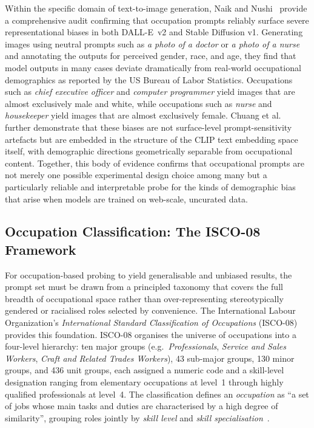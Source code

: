 Within the specific domain of text-to-image generation, Naik and Nushi\
\cite{Naik_2023_SocialBiasesThroughTheTextToImageGenerationLens} provide a comprehensive audit confirming that
occupation prompts reliably surface severe representational biases in both DALL-E~v2 and
Stable Diffusion v1.  Generating images using neutral prompts such as \emph{a photo of a
	doctor} or \emph{a photo of a nurse} and annotating the outputs for perceived gender, race, and age, they find that model
outputs in many cases deviate dramatically from real-world occupational demographics as
reported by the US Bureau of Labor Statistics.  Occupations such as \emph{chief executive
	officer} and \emph{computer programmer} yield images that are almost exclusively male and
white, while occupations such as \emph{nurse} and \emph{housekeeper} yield images that are
almost exclusively female.  Chuang et al.~\cite{Chuang_2023_DebiasingVisionLanguageModelsViaBiasedPrompts} further
demonstrate that these biases are not surface-level prompt-sensitivity artefacts but are
embedded in the structure of the CLIP text embedding space itself, with demographic
directions geometrically separable from occupational content.  Together, this body of
evidence confirms that occupational prompts are not merely one possible experimental design
choice among many but a particularly reliable and interpretable probe for the kinds of
demographic bias that arise when models are trained on web-scale, uncurated data.

\subsection{Occupation Classification: The ISCO-08 Framework}
\label{subsubsec:isco}

For occupation-based probing to yield generalisable and unbiased results, the prompt set must
be drawn from a principled taxonomy that covers the full breadth of occupational space rather
than over-representing stereotypically gendered or racialised roles selected by convenience.
The International Labour Organization's \emph{International Standard Classification of
	Occupations} (ISCO-08)~\cite{ILO_ISCO08} provides this foundation.  ISCO-08 organises the
universe of occupations into a four-level hierarchy: ten major groups (e.g.\
\emph{Professionals}, \emph{Service and Sales Workers}, \emph{Craft and Related Trades
	Workers}), 43 sub-major groups, 130 minor groups, and 436 unit groups, each assigned a
numeric code and a skill-level designation ranging from elementary occupations at level~1
through highly qualified professionals at level~4.  The classification defines an
\emph{occupation} as ``a set of jobs whose main tasks and duties are characterised by a high
degree of similarity'', grouping roles jointly by \emph{skill level} and \emph{skill
	specialisation}~\cite{ILO_ISCO08}.

